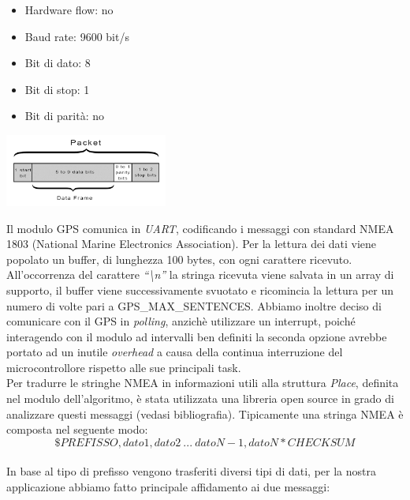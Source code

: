 \begin{itemize}
\item
  
  Hardware flow: no
  
\item
  
  Baud rate: 9600 bit/s
  
\item
  
  Bit di dato: 8
  
\item
  
  Bit di stop: 1
  
\item
  
  Bit di parità: no
  
\end{itemize}

\begin{center}
\includegraphics[width=0.4\textwidth]{figures/image46.png}
\captionsetup{type=figure}
\end{center}

\noindent Il modulo GPS comunica in \emph{UART}, codificando i messaggi con standard NMEA 1803
(National Marine Electronics Association). Per la lettura dei dati viene
popolato un buffer, di lunghezza 100 bytes, con ogni carattere ricevuto.
All'occorrenza del carattere \emph{``\textbackslash n''} la stringa
ricevuta viene salvata in un array di supporto, il buffer viene
successivamente svuotato e ricomincia la lettura per un numero di volte pari a
GPS\_MAX\_SENTENCES. Abbiamo inoltre deciso di comunicare con il
GPS in \textit{polling}, anzichè utilizzare un interrupt, poiché interagendo con
il modulo ad intervalli ben definiti la seconda opzione avrebbe portato
ad un inutile \textit{overhead} a causa della continua interruzione del
microcontrollore rispetto alle sue principali task.\\
Per tradurre le stringhe NMEA in informazioni utili alla struttura
\emph{Place}, definita nel modulo dell'algoritmo, è stata utilizzata una
libreria open source in grado di analizzare questi messaggi (vedasi
bibliografia). Tipicamente una stringa NMEA è composta nel seguente
modo:\\
\[\$ PREFISSO,dato1,dato2\ ...\ datoN - 1,datoN*CHECKSUM\]\\
In base al tipo di prefisso vengono trasferiti diversi tipi di dati, per
la nostra applicazione abbiamo fatto principale affidamento ai due
messaggi:

